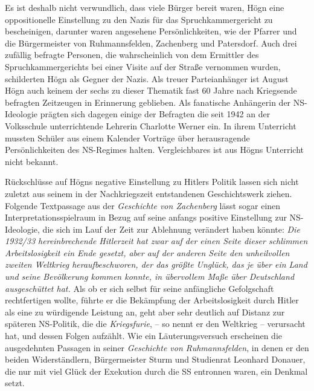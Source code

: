 \documentclass{book}
\begin{document}


Es ist deshalb nicht verwundlich, dass viele Bürger bereit waren, Högn
eine oppositionelle Einstellung zu den Nazis für das
Spruchkammergericht zu bescheinigen, darunter waren angesehene
Persönlichkeiten, wie der Pfarrer und die Bürgermeister von
Ruhmannsfelden, Zachenberg und Patersdorf. Auch drei zufällig befragte
Personen, die wahrscheinlich von dem Ermittler des Spruchkammergerichts
bei einer Visite auf der Straße vernommen wur\-den, schilderten Högn
als Gegner der Nazis. Als treuer Parteianhänger ist Au\-gust Högn auch
keinem der sechs zu dieser Thematik fast 60 Jahre nach Kriegsende
befragten Zeitzeugen in Erinnerung geblieben. Als fanatische
An\-hängerin der NS-Ideologie prägten sich dagegen einige der Befragten
die seit 1942 an der Volksschule unterrichtende Lehrerin Charlotte
Werner ein. In ihrem Unterricht mussten Schüler aus einem Kalender
Vorträge über heraus\-ragende Persönlichkeiten des NS-Regimes halten.
Vergleichbares ist aus Högns Unterricht nicht bekannt.

Rückschlüsse auf Högns negative Einstellung zu Hitlers Politik lassen
sich nicht zuletzt aus seinem in der Nachkriegszeit entstandenen
Geschichtswerk ziehen. Folgende Textpassage aus der \textit{Geschichte
von Zachenberg} lässt sogar einen Interpretationsspielraum in Bezug auf
seine anfangs positive Einstellung zur NS-Ideologie, die sich im Lauf
der Zeit zur Ablehnung verändert haben könn\-te: \textit{Die 1932/33
hereinbrechende Hitlerzeit hat zwar auf der einen Seite dieser
schlimmen Arbeitslosigkeit ein Ende gesetzt, aber auf der anderen Seite
den unheilvollen zweiten Weltkrieg heraufbeschworen, der das größte
Unglück, das je über ein Land und seine Bevölkerung kommen konnte, in
übervollem Maße über Deutschland ausgeschüttet hat. }Als ob er sich
selbst für seine anfängliche Gefolgschaft rechtfertigen wollte, führte
er die Bekämpfung der Arbeitslosigkeit durch Hitler als eine zu
würdigende Leistung an, geht aber sehr deutlich auf Distanz zur
späteren NS-Politik, die die \textit{Kriegsfurie}, – so nennt er den
Weltkrieg – verursacht hat, und dessen Folgen aufzählt. Wie ein
Läuterungsversuch erscheinen die ausgedehnten Passagen in seiner
\textit{Geschichte von Ruhmannsfelden}, in denen er den beiden
Widerständlern, Bürgermeister Sturm und Studienrat Leonhard Donauer,
die nur mit viel Glück der Exekution durch die SS entronnen waren, ein
Denkmal setzt.
\end{document}
